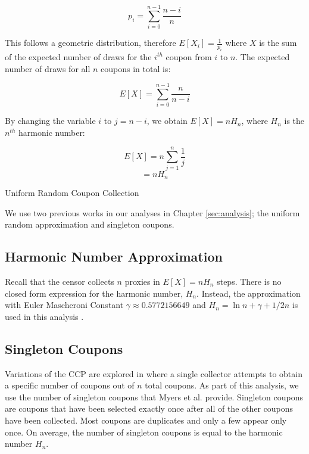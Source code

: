 $$p_i = \sum_{i=0}^{n-1}\frac{n-i}{n}$$

This follows a geometric distribution, therefore $E[X_i]=\frac{1}{p_i}$ where $X$ is the sum of the expected number of draws for the $i^{th}$ coupon from $i$ to $n$.
The expected number of draws for all $n$ coupons in total is:

$$E[X] = \sum_{i=0}^{n-1}\frac{n}{n-i}$$

By changing the variable $i$ to $j=n-i$, we obtain $E[X] = nH_n$, where $H_n$ is the $n^{th}$ harmonic number:

$$E[X] = n \sum_{j=1}^{n}\frac{1}{j}$$
$$= nH_n$$

\begin{algorithm}[t]
\DontPrintSemicolon
{}
\caption{Uniform Random Coupon Collection \label{uni}}
\end{algorithm}

We use two previous works in our analyses in Chapter \ref{sec:analysis}; the uniform random approximation and singleton coupons.

\subsection{Harmonic Number Approximation} 

Recall that the censor collects $n$ proxies in $E[X]= nH_n$ steps. There is no closed form expression for the harmonic number, $H_n$. Instead, the approximation with Euler Mascheroni Constant $\gamma \approx 0.5772156649$ and $H_n = \ln{n} + \gamma + 1/2n$ is used in this analysis \cite{flajolet1992birthday}.

\subsection{Singleton Coupons} 

Variations of the \ac{CCP} are explored in \cite{myers2006some} where a single collector attempts to obtain a specific number of coupons out of $n$ total coupons. As part of this analysis, we use the number of singleton coupons that Myers et al. provide. Singleton coupons are coupons that have been selected exactly once after all of the other coupons have been collected. Most coupons are duplicates and only a few appear only once. On average, the number of singleton coupons is equal to the harmonic number $H_n$.

